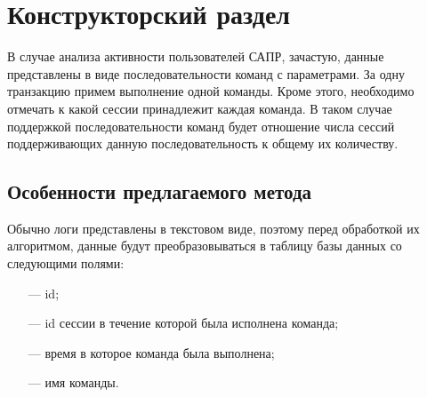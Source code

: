 \chapter{Конструкторский раздел}
\label{cha:design}


В случае анализа активности пользователей САПР, зачастую, данные представлены в виде последовательности команд с параметрами. За одну транзакцию примем выполнение одной команды. Кроме этого, необходимо отмечать к какой сессии принадлежит каждая команда. В таком случае поддержкой последовательности команд будет отношение числа сессий поддерживающих данную последовательность к общему их количеству. 

\section{Особенности предлагаемого метода} %
Обычно логи представлены в текстовом виде, поэтому перед обработкой их алгоритмом, данные будут преобразовываться в таблицу базы данных со следующими полями:
\begin{itemize}
	\item[---] id; %
	\item[---] id сессии в течение которой была исполнена команда;
	\item[---] время в которое команда была выполнена;
	\item[---] имя команды.
\end{itemize}

